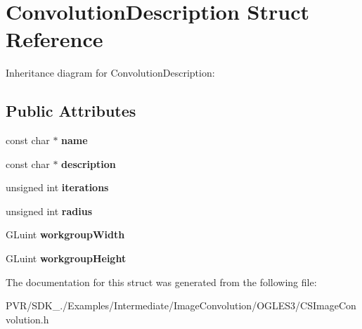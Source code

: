 \hypertarget{struct_convolution_description}{\section{Convolution\+Description Struct Reference}
\label{struct_convolution_description}
}


Inheritance diagram for Convolution\+Description\+:
\subsection*{Public Attributes}
\begin{DoxyCompactItemize}
\item 
\hypertarget{struct_convolution_description_a23c9d92ff57be9c7292c4b2df6d97156}{const char $\ast$ {\bfseries name}}\label{struct_convolution_description_a23c9d92ff57be9c7292c4b2df6d97156}

\item 
\hypertarget{struct_convolution_description_a4747172c7e3f919fac57acc427057c6b}{const char $\ast$ {\bfseries description}}\label{struct_convolution_description_a4747172c7e3f919fac57acc427057c6b}

\item 
\hypertarget{struct_convolution_description_a37dd1dd175aaf9bcb69442653e209659}{unsigned int {\bfseries iterations}}\label{struct_convolution_description_a37dd1dd175aaf9bcb69442653e209659}

\item 
\hypertarget{struct_convolution_description_a7e3f90b4ff65e485f67e9ac975304ba3}{unsigned int {\bfseries radius}}\label{struct_convolution_description_a7e3f90b4ff65e485f67e9ac975304ba3}

\item 
\hypertarget{struct_convolution_description_ad9b56dd326ba368813293385da90f153}{G\+Luint {\bfseries workgroup\+Width}}\label{struct_convolution_description_ad9b56dd326ba368813293385da90f153}

\item 
\hypertarget{struct_convolution_description_a23b7279b472986f048db398d75748347}{G\+Luint {\bfseries workgroup\+Height}}\label{struct_convolution_description_a23b7279b472986f048db398d75748347}

\end{DoxyCompactItemize}


The documentation for this struct was generated from the following file\+:\begin{DoxyCompactItemize}
\item 
P\+V\+R/\+S\+D\+K\+\_./\+Examples/\+Intermediate/\+Image\+Convolution/\+O\+G\+L\+E\+S3/C\+S\+Image\+Convolution.\+h\end{DoxyCompactItemize}
